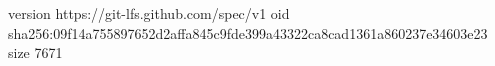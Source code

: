 version https://git-lfs.github.com/spec/v1
oid sha256:09f14a755897652d2affa845c9fde399a43322ca8cad1361a860237e34603e23
size 7671
